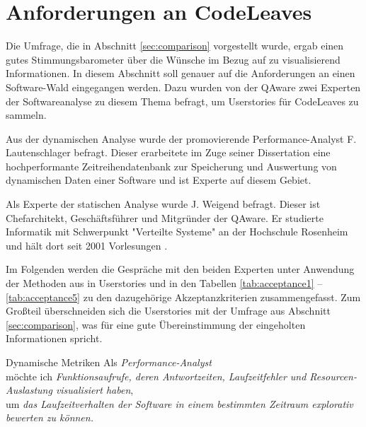 \section{Anforderungen an CodeLeaves}
\label{sec:requirements}

Die Umfrage, die in Abschnitt \ref{sec:comparison} vorgestellt wurde, ergab einen gutes Stimmungsbarometer über die Wünsche im Bezug auf zu visualisierend Informationen. In diesem Abschnitt soll genauer auf die Anforderungen an einen Software-Wald eingegangen werden. Dazu wurden von der QAware zwei Experten der Softwareanalyse zu diesem Thema befragt, um Userstories für CodeLeaves zu sammeln.

Aus der dynamischen Analyse wurde der promovierende Performance-Analyst F. Lautenschlager befragt. Dieser erarbeitete im Zuge seiner Dissertation eine hochperformante Zeitreihendatenbank zur Speicherung und Auswertung von dynamischen Daten einer Software und ist Experte auf diesem Gebiet.

Als Experte der statischen Analyse wurde J. Weigend befragt. Dieser ist Chefarchitekt, Geschäftsführer und Mitgründer der QAware. Er studierte Informatik mit Schwerpunkt "Verteilte Systeme" an der Hochschule Rosenheim und hält dort seit 2001 Vorlesungen \cite{qaware2017johannes}.

Im Folgenden werden die Gespräche mit den beiden Experten unter Anwendung der Methoden aus \cite{cohn2004user} in Userstories und in den Tabellen \ref{tab:acceptance1} -- \ref{tab:acceptance5} zu den dazugehörige Akzeptanzkriterien zusammengefasst. Zum Großteil überschneiden sich die Userstories mit der Umfrage aus Abschnitt \ref{sec:comparison}, was für eine gute Übereinstimmung der eingeholten Informationen spricht.

\begin{userstory}{Dynamische Metriken}
  Als \textit{Performance-Analyst}\\
  möchte ich \textit{Funktionsaufrufe, deren Antwortzeiten, Laufzeitfehler und Resourcen-Auslastung visualisiert haben},\\
  um \textit{das Laufzeitverhalten der Software in einem bestimmten Zeitraum explorativ bewerten zu können.}
\end{userstory}
  
